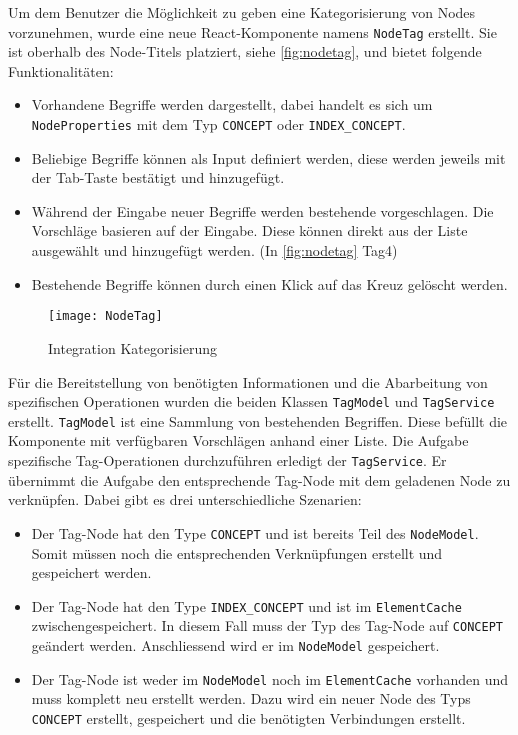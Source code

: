 Um dem Benutzer die Möglichkeit zu geben eine Kategorisierung von Nodes vorzunehmen, wurde eine neue \gls{React}-Komponente namens \texttt{NodeTag} erstellt. Sie ist oberhalb des Node-Titels platziert, siehe \autoref{fig:nodetag}, und bietet folgende Funktionalitäten:
\begin{itemize}
    \item Vorhandene Begriffe werden dargestellt, dabei handelt es sich um \texttt{NodeProperties} mit dem Typ \texttt{CONCEPT} oder \verb|INDEX_CONCEPT|.\\
    \item Beliebige Begriffe können als Input definiert werden, diese werden jeweils mit der Tab-Taste bestätigt und hinzugefügt.\\ 
    \item Während der Eingabe neuer Begriffe werden bestehende vorgeschlagen. Die Vorschläge basieren auf der Eingabe. Diese kön\-nen direkt aus der Liste ausgewählt und hinzugefügt werden. (In \autoref{fig:nodetag} Tag4)\\
    \item Bestehende Begriffe können durch einen Klick auf das Kreuz gelöscht werden.\\
\end{itemize}

    \begin{figure}[H]
    \centering
    \texttt{[image: NodeTag]}
    \caption{Integration Kategorisierung}
    \label{fig:nodetag}
    \end{figure}

Für die Bereitstellung von benötigten Informationen und die Abarbeitung von spezifischen Operationen wurden die beiden Klassen \texttt{TagModel} und \texttt{TagService} erstellt. \texttt{TagModel} ist eine Sammlung von bestehenden Begriffen. Diese befüllt die Komponente mit ver\-füg\-bar\-en Vorschlägen anhand einer Liste. Die Aufgabe spezifische Tag-\-Op\-er\-a\-tion\-en durchzuführen erledigt der \texttt{TagService}. Er übernimmt die Aufgabe den entsprechende Tag-Node mit dem geladenen Node zu verknüpfen. Dabei gibt es drei unterschiedliche Szenarien:
\begin{itemize}
    \item Der Tag-Node hat den Type \texttt{CONCEPT} und ist bereits Teil des \texttt{NodeModel}. Somit müssen noch die entsprechenden Ver\-knüpf\-ung\-en erstellt und gespeichert werden.
    \item Der Tag-Node hat den Type \verb|INDEX_CONCEPT| und ist im \texttt{Ele\-ment\-Cache} zwischengespeichert. In diesem Fall muss der Typ des Tag-Node auf \texttt{CONCEPT} geändert werden. Anschliessend wird er im \texttt{NodeModel} gespeichert. 
    \item Der Tag-Node ist weder im \texttt{NodeModel} noch im \texttt{ElementCache} vorhanden und muss komplett neu erstellt werden. Dazu wird ein neuer Node des Typs \texttt{CONCEPT} erstellt, gespeichert und die benötigten Verbindungen erstellt.
\end{itemize}
    
